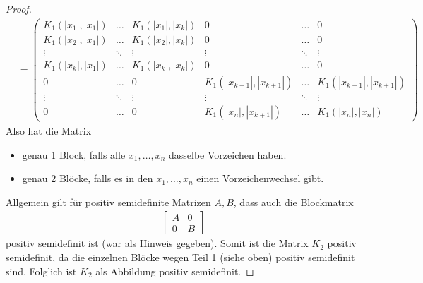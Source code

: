 \begin{proof}
\begin{align*}
		&=\begin{pmatrix}
			K_1(|x_1|,|x_1|) &  \hdots & K_1(|x_1|,|x_k|) & 0 & \hdots & 0\\
			K_1(|x_2|,|x_1|) & \hdots & K_1(|x_2|,|x_k|) & 0 & \hdots & 0\\
			\vdots & \ddots & \vdots & \vdots & \ddots & \vdots\\
			K_1(|x_k|,|x_1|) & \hdots & K_1(|x_k|,|x_k|) & 0 & \hdots & 0\\
			0 & \hdots & 0 & K_1(|x_{k+1}|,|x_{k+1}|) & \hdots & K_1(|x_{k+1}|,|x_{k+1}|)\\
			\vdots & \ddots & \vdots & \vdots & \ddots & \vdots\\
			0 & \hdots & 0 & K_1(|x_{n}|,|x_{k+1}|) & \hdots & K_1(|x_{n}|,|x_{n}|)
		\end{pmatrix}
	\end{align*}
	Also hat die Matrix
	\begin{itemize}
		\item genau 1 Block, falls alle $x_1,\ldots,x_n$ dasselbe Vorzeichen haben.
		\item genau 2 Blöcke, falls es in den $x_1,\ldots,x_n$ einen Vorzeichenwechsel gibt.
	\end{itemize}
	Allgemein gilt für positiv semidefinite Matrizen $A,B$, dass auch die Blockmatrix
		\begin{align*}
			\begin{bmatrix}
				A & 0\\
				0 & B
			\end{bmatrix}
		\end{align*}
		positiv semidefinit ist (war als Hinweis gegeben).
		Somit ist die Matrix $K_2$ positiv semidefinit, da die einzelnen Blöcke wegen Teil 1 (siehe oben) positiv semidefinit sind.
		Folglich ist $K_2$ als Abbildung positiv semidefinit.
\end{proof}

